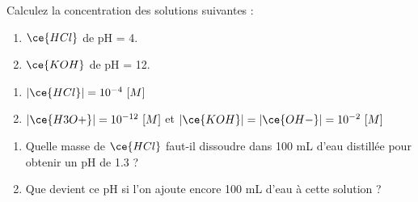\documentclass[
  11pt,
  a4paper,
  openany]{book}
\providecommand{\tightlist}{%
  \setlength{\itemsep}{0pt}\setlength{\parskip}{0pt}}
\begin{document}
\begin{Exercise}

Calculez la concentration des solutions suivantes :

\begin{enumerate}
\def\labelenumi{\alph{enumi}.}
\tightlist
\item
  \(\ce{HCl}\) de pH = 4.
\item
  \(\ce{KOH}\) de pH = 12.
\end{enumerate}

\end{Exercise}

\begin{Answer}

\begin{enumerate}
\def\labelenumi{\alph{enumi}.}
\tightlist
\item
  \(|\ce{HCl}| = 10^{-4}\ [M]\)
  \vspace{1em}
\item
  \(|\ce{H3O+}| = 10^{-12}\ [M]\) et \(|\ce{KOH}| = |\ce{OH-}| = 10^{-2}\ [M]\)
\end{enumerate}

\end{Answer}

\begin{Exercise}

\begin{enumerate}
\def\labelenumi{\alph{enumi}.}
\tightlist
\item
  Quelle masse de \(\ce{HCl}\) faut-il dissoudre dans 100 mL d'eau distillée pour obtenir un pH de 1.3 ?
\item
  Que devient ce pH si l'on ajoute encore 100 mL d'eau à cette solution ?
\end{enumerate}

\end{Exercise}
\end{document}
